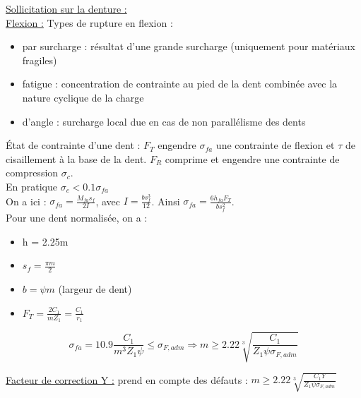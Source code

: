 \documentclass[../main.tex]{subfiles}
\begin{document}
\quad \underline{Sollicitation sur la denture :}\\

\underline{Flexion :} Types de rupture en flexion :\begin{itemize}
    \item par surcharge : résultat d'une grande surcharge (uniquement pour matériaux fragiles)\\
    \item fatigue : concentration de contrainte au pied de la dent combinée avec la nature cyclique de la charge\\
    \item d'angle : surcharge local due en cas de non parallélisme des dents\\
\end{itemize}

État de contrainte d'une dent : $F_T$ engendre $\sigma_{fa}$ une contrainte de flexion et $\tau$ de cisaillement à la base de la dent. $F_R$ comprime et engendre une contrainte de compression $\sigma_c$. \\
En pratique $\sigma_c < 0.1\sigma_{fa}$\\
On a ici : $\sigma_{fa} = \frac{M_{fa}s_f}{2I}$, avec $I = \frac{bs_f^3}{12}$. Ainsi $\sigma_{fa} = \frac{6 h_{fa} F_T}{b s_f^2}$.\\

Pour une dent normalisée, on a :\\
\begin{itemize}
    \item h = 2.25m\\
    \item  $s_f = \frac{\pi m}{2}$\\
    \item $b = \psi m$ (largeur de dent)\\
    \item $F_T = \frac{2 C_1}{mZ_1} = \frac{C_1}{r_1}$\\
\end{itemize}

\begin{equation}
    \sigma_{fa} = 10.9 \frac{C_1}{m^3 Z_1 \psi} \leq \sigma_{F,adm} \Rightarrow m \geq 2.22 \sqrt[3]{\frac{C_1}{Z_1 \psi \sigma_{F,adm}}}
\end{equation}

\quad \underline{Facteur de correction Y :} prend en compte des défauts : $m \geq 2.22 \sqrt[3]{\frac{C_1 Y}{Z_1 \psi \sigma_{F,adm}}}$\\
\end{document}
